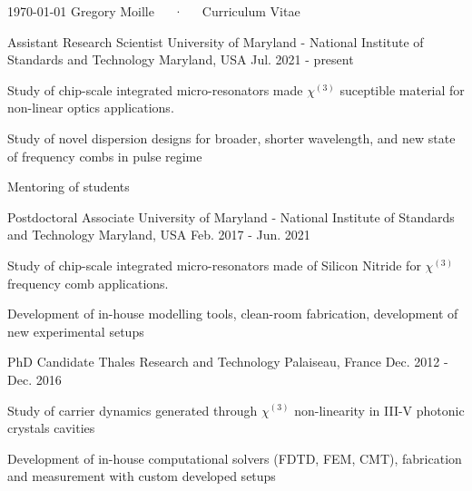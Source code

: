 \documentclass[11pt, a4paper]{customcv}
\begin{document}
\makecvheader
\makecvfooter
  {\today}
  {Gregory Moille~~~·~~~Curriculum Vitae}
  {\thepage}

%
{%
}
%
{
    \cventry%
        {Assistant Research Scientist} %
        {University of Maryland - National Institute of Standards and Technology} %
        {Maryland, USA} %
        {Jul. 2021 - present} %
        {
          \begin{cvitems} %
            \item {Study of chip-scale integrated micro-resonators made $\chi^{(3)}$ suceptible material for non-linear optics applications.}
            \item{Study of novel dispersion designs for broader, shorter wavelength, and new state of frequency combs in pulse regime}
            \item{Mentoring of students}
          \end{cvitems}
        }
    \cventry%
        {Postdoctoral Associate} %
        {University of Maryland - National Institute of Standards and Technology} %
        {Maryland, USA} %
        {Feb. 2017 - Jun. 2021} %
        {
          \begin{cvitems} %
            \item {Study of chip-scale integrated micro-resonators made of Silicon Nitride for $\chi^{(3)}$ frequency comb applications.}
            \item{Development of in-house modelling tools, clean-room fabrication, development of new experimental setups}
          \end{cvitems}
        }
    \cventry
        {PhD Candidate} %
        {Thales Research and Technology} %
        {Palaiseau, France} %
        {Dec. 2012 - Dec. 2016} %
        {
          \begin{cvitems} %
            \item {Study of carrier dynamics generated through $\chi^{(3)}$ non-linearity in III-V photonic crystals cavities}
            \item {Development of in-house computational solvers (FDTD, FEM, CMT), fabrication and measurement with custom developed setups}
          \end{cvitems}
        }
}%
\end{document}
